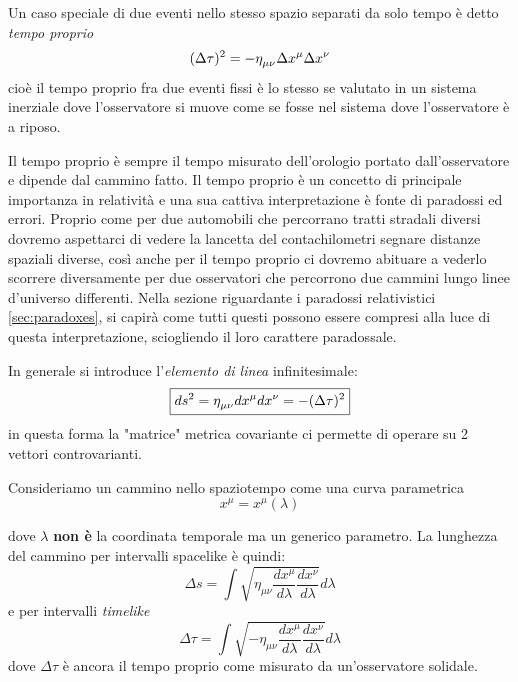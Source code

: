 \documentclass[twoside]{article}
\begin{document}
Un caso speciale di due eventi nello stesso spazio separati da solo tempo è detto \emph{tempo proprio} 
\begin{equation}
	(\Delta \tau)^2 = - \eta\indices{_\mu_\nu} \Delta x^\mu \Delta x^\nu
\end{equation}
cioè il tempo proprio fra due eventi fissi è lo stesso se valutato in un sistema inerziale dove l'osservatore si muove come se fosse nel sistema dove l'osservatore è a riposo.

Il tempo proprio è sempre il tempo misurato dell'orologio portato dall'osservatore e dipende dal cammino fatto. Il tempo proprio è un concetto di principale importanza in relatività e una sua cattiva interpretazione è fonte di paradossi ed errori. Proprio come per due automobili che percorrano tratti stradali diversi dovremo aspettarci di vedere la lancetta del contachilometri segnare distanze spaziali diverse, così anche per il tempo proprio ci dovremo abituare a vederlo scorrere diversamente per due osservatori che percorrono due cammini lungo linee d'universo differenti. Nella sezione riguardante i paradossi relativistici \ref{sec:paradoxes}, si capirà come tutti questi possono essere compresi alla luce di questa interpretazione, sciogliendo il loro carattere paradossale.

In generale si introduce l'\emph{elemento di linea} infinitesimale:
\begin{equation}
\boxed{	ds^2 = \eta\indices{_\mu_\nu} dx^\mu dx^\nu = -(\Delta \tau)^2 }
\end{equation}
in questa forma la "matrice" metrica covariante ci permette di operare su 2 vettori controvarianti.

Consideriamo un cammino nello spaziotempo come una curva parametrica
\begin{equation}
	x^\mu = x^\mu(\lambda)
\end{equation}

dove $\lambda$ \textbf{non è} la coordinata temporale ma un generico parametro. La lunghezza del cammino per intervalli spacelike è quindi:
\begin{equation}
	\Delta s = \int \sqrt{\eta_{\mu \nu} \dfrac{dx^\mu}{d\lambda} \dfrac{dx^\nu}{d\lambda}} d\lambda
\end{equation}
e per intervalli \emph{timelike}
\begin{equation}
	\Delta \tau = \int \sqrt{ -\eta_{\mu \nu} \dfrac{dx^\mu}{d\lambda} \dfrac{dx^\nu}{d\lambda}} d\lambda
\end{equation}
dove $\Delta \tau$ è ancora il tempo proprio come misurato da un'osservatore solidale.
\end{document}
